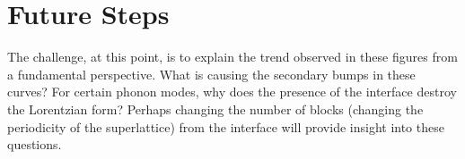 \documentclass{article}
\begin{document}
\begin{figure}[ht]
\centering
{}
\end{figure} 
\section*{Future Steps}
The challenge, at this point, is to explain the trend observed in these figures from a fundamental perspective. What is causing the secondary bumps in these curves? For certain phonon modes, why does the presence of the interface destroy the Lorentzian form? Perhaps changing the number of blocks (changing the periodicity of the superlattice) from the interface will provide insight into these questions.
\end{document}
